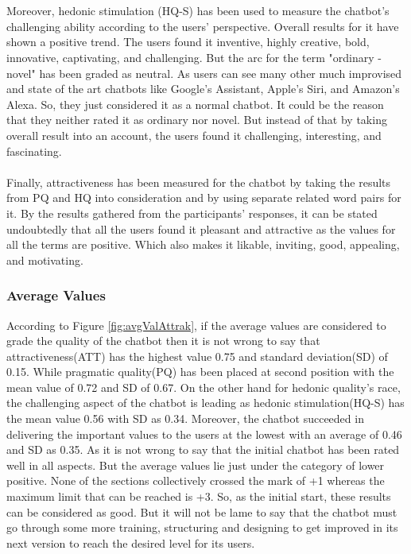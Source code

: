 \\~\\
Moreover, hedonic stimulation (HQ-S) has been used to measure the chatbot's challenging ability according to the users' perspective. Overall results for it have shown a positive trend. The users found it inventive, highly creative, bold, innovative, captivating, and challenging. But the arc for the term "ordinary - novel" has been graded as neutral. As users can see many other much improvised and state of the art chatbots like Google's Assistant, Apple's Siri, and Amazon's Alexa. So, they just considered it as a normal chatbot. It could be the reason that they neither rated it as ordinary nor novel. But instead of that by taking overall result into an account, the users found it challenging, interesting, and fascinating.
\\~\\
Finally, attractiveness has been measured for the chatbot by taking the results from PQ and HQ into consideration and by using separate related word pairs for it. By the results gathered from the participants' responses, it can be stated undoubtedly that all the users found it pleasant and attractive as the values for all the terms are positive. Which also makes it likable, inviting, good, appealing, and motivating.

\subsubsection*{Average Values}
According to Figure \ref{fig:avgValAttrak}, if the average values are considered to grade the quality of the chatbot then it is not wrong to say that attractiveness(ATT) has the highest value 0.75 and standard deviation(SD) of 0.15. While pragmatic quality(PQ) has been placed at second position with the mean value of 0.72 and SD of 0.67. On the other hand for hedonic quality's race, the challenging aspect of the chatbot is leading as hedonic stimulation(HQ-S) has the mean value 0.56 with SD as 0.34. Moreover, the chatbot succeeded in delivering the important values to the users at the lowest with an average of 0.46 and SD as 0.35. As it is not wrong to say that the initial chatbot has been rated well in all aspects. But the average values lie just under the category of lower positive. None of the sections collectively crossed the mark of +1 whereas the maximum limit that can be reached is +3. So, as the initial start, these results can be considered as good. But it will not be lame to say that the chatbot must go through some more training, structuring and designing to get improved in its next version to reach the desired level for its users.

